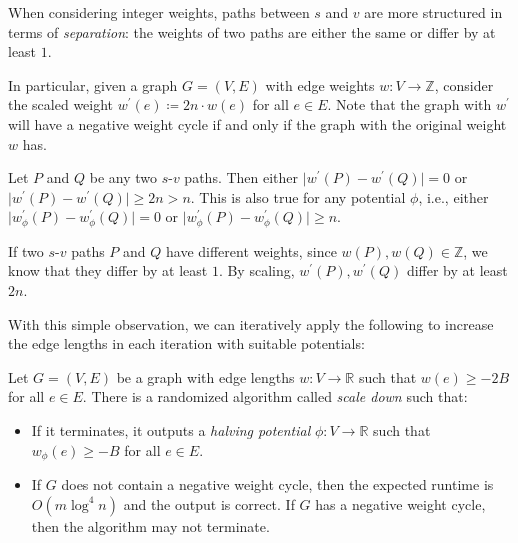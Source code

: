 \begin{intuition}[Scaling]
	When considering integer weights, paths between \(s\) and \(v\) are more structured in terms of \emph{separation}: the weights of two paths are either the same or differ by at least \(1\).
\end{intuition}

In particular, given a graph \(G = (V, E)\) with edge weights \(w \colon V \to \mathbb{Z} \), consider the scaled weight \(w^{\prime} (e) \coloneqq 2n \cdot w(e)\) for all \(e \in E\). Note that the graph with \(w^{\prime} \) will have a negative weight cycle if and only if the graph with the original weight \(w\) has.

\begin{claim}
	Let \(P\) and \(Q\) be any two \(s\)-\(v\) paths. Then either \(\lvert w^{\prime} (P) - w^{\prime} (Q) \rvert = 0\) or \(\lvert w^{\prime} (P) - w^{\prime} (Q) \rvert \geq 2n > n\). This is also true for any potential \(\phi \), i.e., either \(\lvert w^{\prime} _\phi (P) - w^{\prime} _\phi (Q) \rvert = 0\) or \(\lvert w^{\prime} _\phi (P) - w^{\prime} _\phi (Q) \rvert \geq n\).
\end{claim}
\begin{explanation}
	If two \(s\)-\(v\) paths \(P\) and \(Q\) have different weights, since \(w(P) , w(Q) \in \mathbb{Z} \), we know that they differ by at least \(1\). By scaling, \(w^{\prime} (P), w^{\prime} (Q)\) differ by at least \(2n\).
\end{explanation}

With this simple observation, we can iteratively apply the following to increase the edge lengths in each iteration with suitable potentials:

\begin{theorem}\label{thm:SSSP-scale-down}
	Let \(G = (V, E)\) be a graph with edge lengths \(w\colon V \to \mathbb{R} \) such that \(w(e) \geq -2B\) for all \(e \in E\). There is a randomized algorithm called \emph{scale down} such that:
	\begin{itemize}
		\item If it terminates, it outputs a \emph{halving potential} \(\phi \colon V \to \mathbb{R} \) such that \(w_{\phi }(e) \geq -B\) for all \(e \in E\).
		\item If \(G\) does not contain a negative weight cycle, then the expected runtime is \(O(m \log ^4 n)\) and the output is correct. If \(G\) has a negative weight cycle, then the algorithm may not terminate.
	\end{itemize}
\end{theorem}

